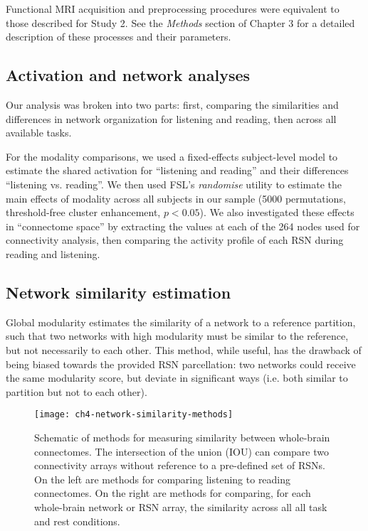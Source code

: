 Functional MRI acquisition and preprocessing procedures were equivalent to those described for Study 2. See the \textit{Methods} section of Chapter 3 for a detailed description of these processes and their parameters.

\subsection{Activation and network analyses}

Our analysis was broken into two parts: first, comparing the similarities and differences in network organization for listening and reading, then across all available tasks. 

For the modality comparisons, we used a fixed-effects subject-level model to estimate the shared activation for ``listening and reading'' and their differences ``listening vs. reading''. We then used FSL's \textit{randomise} utility to estimate the main effects of modality across all subjects in our sample (5000 permutations, threshold-free cluster enhancement, $p < 0.05$).  We also investigated these effects in ``connectome space'' by extracting the values at each of the 264 nodes used for connectivity analysis, then comparing the activity profile of each RSN during reading and listening.

\subsection{Network similarity estimation}

Global modularity estimates the similarity of a network to a reference partition, such that two networks with high modularity must be similar to the reference, but not necessarily to each other. This method, while useful, has the drawback of being biased towards the provided RSN parcellation: two networks could receive the same modularity score, but deviate in significant ways (i.e. both similar to partition but not to each other). 

\begin{figure}[t]
	\centering
	\texttt{[image: ch4-network-similarity-methods]}
    \caption[Methods for measuring similarity between whole-brain connectomes]{Schematic of methods for measuring similarity between whole-brain connectomes. The intersection of the union (IOU) can compare two connectivity arrays without reference to a pre-defined set of RSNs. On the left are methods for comparing listening to reading connectomes. On the right are methods for comparing, for each whole-brain network or RSN array, the similarity across all all task and rest conditions.}
	\label{fig:ch4-network-similarity-methods}
\end{figure}

